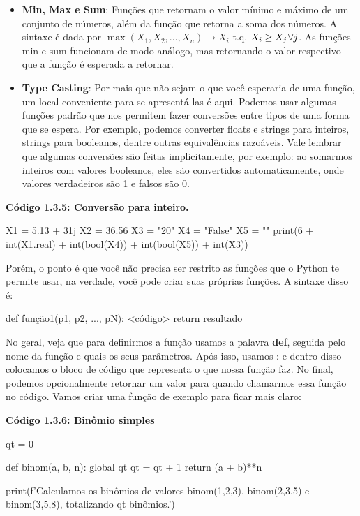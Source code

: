\documentclass[11pt, a4paper]{article}
\begin{document}
\begin{itemize}
    \item \textbf{Min, Max e Sum}: Funções que retornam o valor mínimo e máximo de um conjunto de números, além da função que retorna a soma dos números. A sintaxe é dada por \(\max(X_1,X_2,...,X_n) \rightarrow X_i\) t.q. \(X_i \geq X_j \tb[0.1] \forall j\). As funções min e sum funcionam de modo análogo, mas retornando o valor respectivo que a função é esperada a retornar.

    \item \textbf{Type Casting}: Por mais que não sejam o que você esperaria de uma função, um local conveniente para se apresentá-las é aqui. Podemos usar algumas funções padrão que nos permitem fazer conversões entre tipos de uma forma que se espera. Por exemplo, podemos converter floats e strings para inteiros, strings para booleanos, dentre outras equivalências razoáveis. Vale lembrar que algumas conversões são feitas implicitamente, por exemplo: ao somarmos inteiros com valores booleanos, eles são convertidos automaticamente, onde valores verdadeiros são 1 e falsos são 0.

\end{itemize}

\textbf{Código 1.3.5: Conversão para inteiro.}

\begin{code}
X1 = 5.13 + 31j
X2 = 36.56
X3 = "20"
X4 = "False"
X5 = ""
print(6 + int(X1.real) + int(bool(X4)) + int(bool(X5)) + int(X3))
\end{code}

Porém, o ponto é que você não precisa ser restrito as funções que o Python te permite usar, na verdade, você pode criar suas próprias funções. A sintaxe disso é:

\begin{code}
def função1(p1, p2, ..., pN):
    <código>
    return resultado
\end{code}

No geral, veja que para definirmos a função usamos a palavra \textbf{def}, seguida pelo nome da função e quais os seus parâmetros. Após isso, usamos : e dentro disso colocamos o bloco de código que representa o que nossa função faz. No final, podemos opcionalmente retornar um valor para quando chamarmos essa função no código. Vamos criar uma função de exemplo para ficar mais claro:

\textbf{Código 1.3.6: Binômio simples}

\begin{code}
qt = 0

def binom(a, b, n):
    global qt
    qt = qt + 1
    return (a + b)**n

print(f'Calculamos os binômios de valores {binom(1,2,3)}, {binom(2,3,5)} e {binom(3,5,8)}, totalizando {qt} binômios.')
\end{code}
\end{document}
